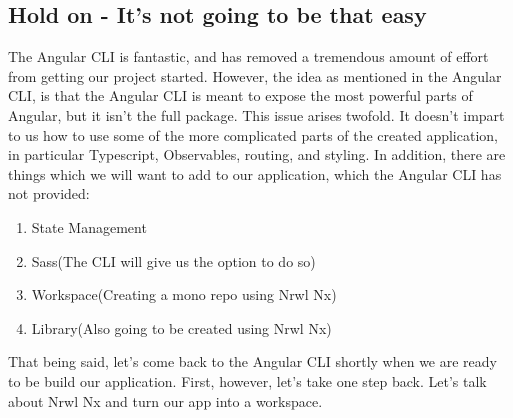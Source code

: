 \subsection{Hold on - It's not going to be that easy}

The Angular CLI is fantastic, and has removed a tremendous amount of effort from
getting our project started. However, the idea as mentioned in the Angular CLI,
is that the Angular CLI is meant to expose the most powerful parts of Angular,
but it isn't the full package. This issue arises twofold. It doesn't impart to
us how to use some of the more complicated parts of the created application, in
particular Typescript, Observables, routing, and styling. In addition,
there are things which we will want to add to our application, which the Angular
CLI has not provided:
\begin{enumerate}
  \item State Management
  \item Sass(The CLI will give us the option to do so)
  \item Workspace(Creating a mono repo using Nrwl Nx)
  \item Library(Also going to be created using Nrwl Nx)
\end{enumerate}

That being said, let's come back to the Angular CLI shortly when we are ready
to be build our application. First, however, let's take one step back. Let's
talk about Nrwl Nx and turn our app into a workspace.
